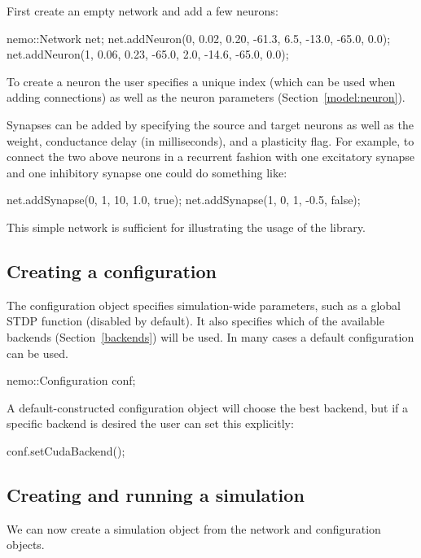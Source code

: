\documentclass[a4paper]{article}
\begin{document}
First create an empty network and add a few neurons:

\begin{ccode}
nemo::Network net;
net.addNeuron(0, 0.02, 0.20, -61.3, 6.5, -13.0, -65.0, 0.0);
net.addNeuron(1, 0.06, 0.23, -65.0, 2.0, -14.6, -65.0, 0.0);
\end{ccode}

To create a neuron the user specifies a unique index
	(which can be used when adding connections)
	as well as the neuron parameters (Section~\ref{model:neuron}).

Synapses can be added by specifying the source and target neurons as well as
	the weight, conductance delay (in milliseconds), and a plasticity flag.
For example, to connect the two above neurons in a recurrent fashion
	with one excitatory synapse and one inhibitory synapse one could do something like:

\begin{ccode}
net.addSynapse(0, 1, 10, 1.0, true);
net.addSynapse(1, 0, 1, -0.5, false);
\end{ccode}

This simple network is sufficient for illustrating the usage of the library. 

\subsection{Creating a configuration}

The configuration object specifies simulation-wide parameters, 
	such as a global STDP function (disabled by default).
It also specifies which of the available backends (Section~\ref{backends}) will be used. 
In many cases a default configuration can be used.

\begin{ccode}
nemo::Configuration conf;
\end{ccode}

A default-constructed configuration object will choose the best backend,
	but if a specific backend is desired the user can set this explicitly:

\begin{ccode}
conf.setCudaBackend();
\end{ccode}

\subsection{Creating and running a simulation}

We can now create a simulation object from the network and configuration objects.
\end{document}
